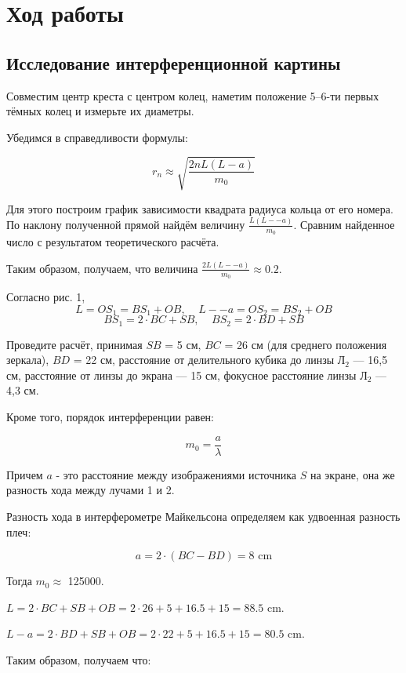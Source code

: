\section{Ход работы}


\subsection{Исследование интерференционной картины}


Совместим центр креста с центром колец, наметим положение 5–6-ти
первых тёмных колец и измерьте их диаметры.

Убедимся в справедливости формулы:

\[ r_n \approx \sqrt{\frac{2nL(L-a)}{m_0}}  \]


Для этого построим график зависимости квадрата радиуса кольца от его номера. По наклону полученной прямой найдём величину $\frac{L(L -- a)}{m_0}$. Сравним найденное число с результатом теоретического расчёта. 

Таким образом, получаем, что величина $\frac{2L(L -- a)}{m_0} \approx 0.2$.

Согласно рис. 1,
\[ L = OS_1 = BS_1 + OB , \:\:\:\:\: L -- a = OS_2 = BS_2 + OB \]
\[ BS_1 = 2\cdot BC + SB, \:\:\:\:\: BS_2 = 2\cdot BD + SB \]
 
 Проведите расчёт, принимая $SB$ = 5 см, $BC$ = 26 см
(для среднего положения зеркала), $BD$ = 22 см, расстояние от делительного кубика до линзы $Л_2$ — 16,5 см, расстояние от линзы до экрана — 15 см, фокусное расстояние линзы $Л_2$ — 4,3 см.

Кроме того, порядок интерференции равен: 

\[    m_0 = \frac{a}{\lambda}           \]

Причем $a$ - это расстояние между изображениями источника $S$ на экране, она же разность хода между лучами 1 и 2.

Разность хода в интерферометре Майкельсона определяем как удвоенная разность плеч:

\[    a = 2 \cdot (BC - BD)  = 8 \text{  cm}  \]


Тогда $m_0  \approx $ 125000. 

$ L =  2\cdot BC + SB + OB = 2 \cdot 26 + 5 + 16.5 + 15 = 88.5$ cm.

$ L - a = 2\cdot BD + SB + OB = 2 \cdot 22 + 5 + 16.5 + 15 = 80.5 $ cm.

Таким образом, получаем что: 

